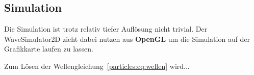 \subsection{Simulation}
Die Simulation ist trotz relativ tiefer Auflösung nicht trivial. 
Der WaveSimulator2D zieht dabei nutzen aus \textbf{OpenGL} um die Simulation auf der Grafikkarte laufen zu lassen. %

Zum Lösen der Wellengleichung~\ref{particles:eq:wellen} wird... %